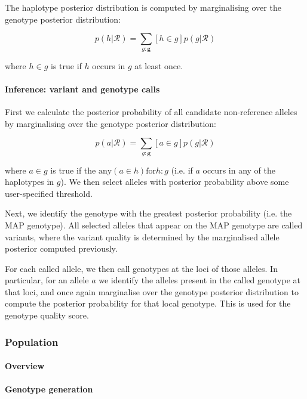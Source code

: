 \documentclass{article}
\begin{document}
The haplotype posterior distribution is computed by marginalising over the genotype posterior distribution:

\begin{equation}
p(h | \mathcal{R}) = \sum_{g : \boldsymbol{g}} [h \in g]p(g | \mathcal{R})
\end{equation}

where $h \in g$ is true if $h$ occurs in $g$ at least once.

\paragraph{Inference: variant and genotype calls}\label{calling:individual-variants}

First we calculate the posterior probability of all candidate non-reference alleles by marginalising over the genotype posterior distribution:

\begin{equation}
p(a | \mathcal{R}) = \sum_{g : \boldsymbol{g}} [a \in g]p(g | \mathcal{R})
\end{equation}

where $a \in g$ is true if the $\text{any}(a \in h) \text{for} h : g$ (i.e. if $a$ occurs in any of the haplotypes in $g$). We then select alleles with posterior probability above some user-specified threshold.

Next, we identify the genotype with the greatest posterior probability (i.e. the MAP genotype). All selected alleles that appear on the MAP genotype are called variants, where the variant quality is determined by the marginalised allele posterior computed previously.

For each called allele, we then call genotypes at the loci of those alleles. In particular, for an allele $a$ we identify the alleles present in the called genotype at that loci, and once again marginalise over the genotype posterior distribution to compute the posterior probability for that local genotype. This is used for the genotype quality score.

\subsubsection{Population}

\paragraph{Overview}
\paragraph{Genotype generation}
\end{document}

